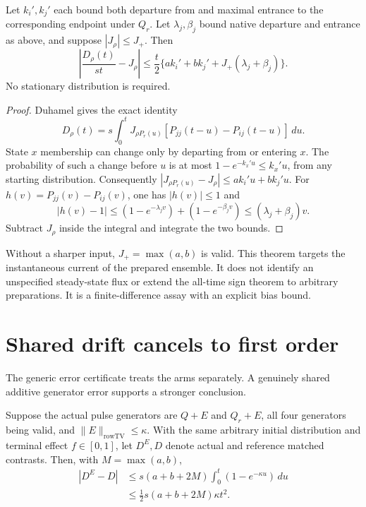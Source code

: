 \begin{theorem}
\label{robustphysics:nonstationary}
Let $k_i',k_j'$ each bound both departure from and maximal entrance to the
corresponding endpoint under $Q_r$. Let $\lambda_j,\beta_j$ bound native
departure and entrance as above, and suppose $|J_\rho|\le J_+$.
Then
\begin{equation}\label{robustphysics:nonstationarybound}
 \left|\frac{D_\rho(t)}{st}-J_\rho\right|
 \le\frac t2\{a k_i'+b k_j'+J_+(\lambda_j+\beta_j)\}.
\end{equation}
No stationary distribution is required.
\end{theorem}

\begin{proof}
Duhamel gives the exact identity
\[
 D_\rho(t)=s\int_0^t J_{\rho P_r(u)}
                [P_{jj}(t-u)-P_{ij}(t-u)]\,du.
\]
State $x$ membership can change only by departing from or entering $x$.
The probability of such a change before $u$ is at most
$1-e^{-k_x'u}\le k_x'u$, from any starting distribution. Consequently
$|J_{\rho P_r(u)}-J_\rho|\le a k_i'u+b k_j'u$.
For $h(v)=P_{jj}(v)-P_{ij}(v)$, one has $|h(v)|\le1$ and
\[
 |h(v)-1|\le(1-e^{-\lambda_jv})+(1-e^{-\beta_jv})
             \le(\lambda_j+\beta_j)v.
\]
Subtract $J_\rho$ inside the integral and integrate the two bounds.
\end{proof}

Without a sharper input, $J_+=\max(a,b)$ is valid. This theorem targets
the instantaneous current of the prepared ensemble. It does not identify an
unspecified steady-state flux or extend the all-time sign theorem to arbitrary
preparations. It is a finite-difference assay with an explicit bias bound.

\section{Shared drift cancels to first order}

The generic error certificate treats the arms separately. A genuinely shared
additive generator error supports a stronger conclusion.

\begin{theorem}
\label{robustphysics:shareddrift}
Suppose the actual pulse generators are $Q+E$ and $Q_r+E$, all four
generators being valid, and $\|E\|_{\mathrm{rowTV}}\le\kappa$. With the
same arbitrary initial distribution and terminal effect $f\in[0,1]$, let
$D^E,D$ denote actual and reference matched contrasts. Then, with
$M=\max(a,b)$,
\begin{align*}
 |D^E-D|&\le s(a+b+2M)\int_0^t(1-e^{-\kappa u})\,du\\
         &\le \tfrac12 s(a+b+2M)\kappa t^2.
\end{align*}
\end{theorem}

